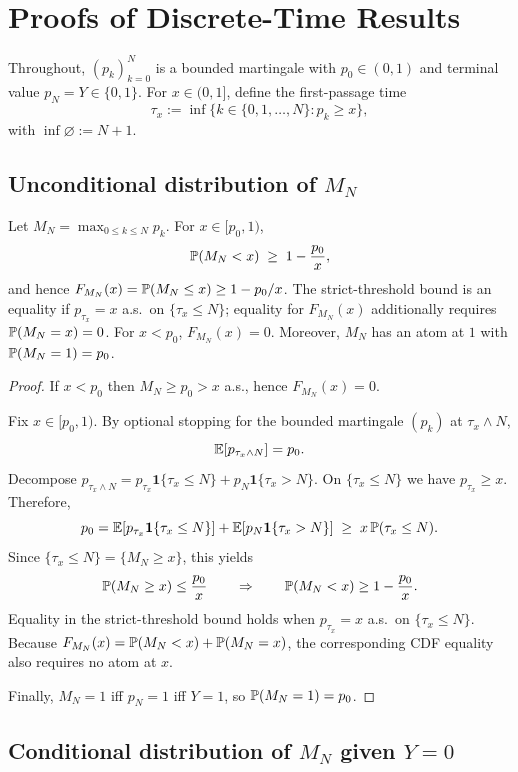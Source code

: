 \section{Proofs of Discrete-Time Results} \label{app:discrete-proofs}

Throughout, $(p_k)_{k=0}^N$ is a bounded martingale with $p_0\in(0,1)$ and terminal value $p_N=Y\in\{0,1\}$.
For $x\in(0,1]$, define the first-passage time
\[
\tau_x := \inf\{k\in\{0,1,\dots,N\}: p_k\ge x\},
\]
with $\inf\varnothing := N+1$.

\subsection{Unconditional distribution of \texorpdfstring{$M_N$}{M N}}

\begin{theorem} \label{thm:supp-discrete-unconditional}
Let $M_N=\max_{0\le k\le N} p_k$. For $x\in[p_0,1)$,
\[
\P(M_N<x)\;\ge\;1-\frac{p_0}{x},
\]
and hence $F_{M_N}(x)=\P(M_N\le x)\ge 1-p_0/x$.
The strict-threshold bound is an equality if $p_{\tau_x}=x$ a.s.\ on $\{\tau_x\le N\}$; equality for $F_{M_N}(x)$ additionally requires $\P(M_N=x)=0$.
For $x<p_0$, $F_{M_N}(x)=0$.
Moreover, $M_N$ has an atom at $1$ with $\P(M_N=1)=p_0$.
\end{theorem}

\begin{proof}
If $x<p_0$ then $M_N\ge p_0>x$ a.s., hence $F_{M_N}(x)=0$.

Fix $x\in[p_0,1)$. By optional stopping for the bounded martingale $(p_k)$ at $\tau_x\wedge N$,
\[
\E[p_{\tau_x\wedge N}] = p_0.
\]
Decompose $p_{\tau_x\wedge N}=p_{\tau_x}\mathbf 1\{\tau_x\le N\}+p_N\mathbf 1\{\tau_x>N\}$.
On $\{\tau_x\le N\}$ we have $p_{\tau_x}\ge x$.
Therefore,
\[
p_0
= \E[p_{\tau_x}\mathbf 1\{\tau_x\le N\}] + \E[p_N\mathbf 1\{\tau_x>N\}]
\;\ge\; x\,\P(\tau_x\le N).
\]
Since $\{\tau_x\le N\}=\{M_N\ge x\}$, this yields
\[
\P(M_N\ge x)\le \frac{p_0}{x}\qquad\Rightarrow\qquad
\P(M_N<x)\ge 1-\frac{p_0}{x}.
\]
Equality in the strict-threshold bound holds when $p_{\tau_x}=x$ a.s.\ on $\{\tau_x\le N\}$.
Because $F_{M_N}(x)=\P(M_N<x)+\P(M_N=x)$, the corresponding CDF equality also requires no atom at $x$.

Finally, $M_N=1$ iff $p_N=1$ iff $Y=1$, so $\P(M_N=1)=p_0$.
\end{proof}

\subsection{Conditional distribution of \texorpdfstring{$M_N$ given $Y=0$}{M N given Y=0}}

